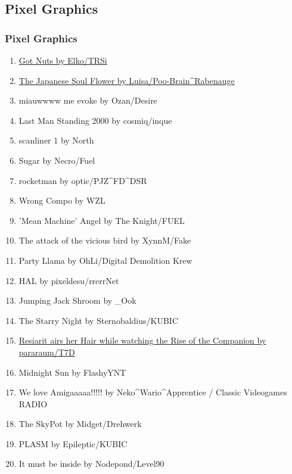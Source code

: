 \documentclass{beamer}
\begin{document}
\subsection{Pixel Graphics}
\begin{frame}
  \frametitle{Pixel Graphics}
  \begin{enumerate}
  \item \href{https://demozoo.org/graphics/191965/}{Got Nuts by Elko/TRSi}
  \item \href{https://demozoo.org/graphics/191961/}{The Japanese Soul Flower by Luisa/Poo-Brain\^{}Rabenauge}
  \item miauwwww me evoke by Ozan/Desire
  \item Last Man Standing 2000 by cosmiq/inque
  \item scanliner 1 by North
  \item Sugar by Necro/Fuel
  \item rocketman by optic/PJZ\^{}FD\^{}DSR
  \item Wrong Compo by WZL
  \item 'Mean Machine' Angel by The Knight/FUEL
  \item The attack of the vicious bird by XynnM/Fake
  \item Party Llama by OhLi/Digital Demolition Krew
  \end{enumerate}
\end{frame}
\begin{frame}
  \begin{enumerate}
    \setcounter{enumi}{11}
  \item HAL by pixeldesu/rrerrNet
  \item Jumping Jack Shroom by \_Ook
  \item The Starry Night by Sternobaldius/KUBIC
  \item \href{https://files.scene.org/view/parties/2018/evoke18/pixel_graphics/animation.resiarit.gif}{Resiarit airs her Hair while watching the Rise of the Companion by pararaum/T7D}
  \item Midnight Sun by FlashyYNT
  \item We love Amigaaaaa!!!!! by Neko\^{}Wario\^{}Apprentice / Classic Videogames RADIO
  \item The SkyPot by Midget/Drehwerk
  \item PLASM by Epileptic/KUBIC
  \item It must be inside by Nodepond/Level90
  \end{enumerate}
\end{frame}
\end{document}
